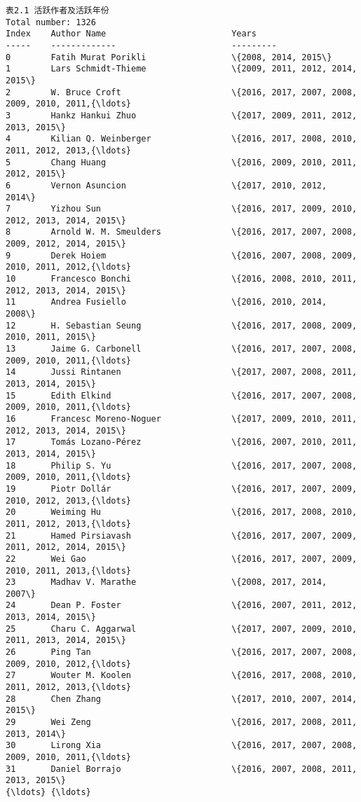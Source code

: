 \documentclass[11pt]{article}
\begin{document}
    \begin{Verbatim}[commandchars=\\\{\}]
                                  表2.1 活跃作者及活跃年份                   
Total number: 1326
Index    Author Name                         Years     
-----    -------------                       --------- 
0        Fatih Murat Porikli                 \{2008, 2014, 2015\}
1        Lars Schmidt-Thieme                 \{2009, 2011, 2012, 2014, 2015\}
2        W. Bruce Croft                      \{2016, 2017, 2007, 2008, 2009, 2010, 2011,{\ldots}
3        Hankz Hankui Zhuo                   \{2017, 2009, 2011, 2012, 2013, 2015\}
4        Kilian Q. Weinberger                \{2016, 2017, 2008, 2010, 2011, 2012, 2013,{\ldots}
5        Chang Huang                         \{2016, 2009, 2010, 2011, 2012, 2015\}
6        Vernon Asuncion                     \{2017, 2010, 2012, 2014\}
7        Yizhou Sun                          \{2016, 2017, 2009, 2010, 2012, 2013, 2014, 2015\}
8        Arnold W. M. Smeulders              \{2016, 2017, 2007, 2008, 2009, 2012, 2014, 2015\}
9        Derek Hoiem                         \{2016, 2007, 2008, 2009, 2010, 2011, 2012,{\ldots}
10       Francesco Bonchi                    \{2016, 2008, 2010, 2011, 2012, 2013, 2014, 2015\}
11       Andrea Fusiello                     \{2016, 2010, 2014, 2008\}
12       H. Sebastian Seung                  \{2016, 2017, 2008, 2009, 2010, 2011, 2015\}
13       Jaime G. Carbonell                  \{2016, 2017, 2007, 2008, 2009, 2010, 2011,{\ldots}
14       Jussi Rintanen                      \{2017, 2007, 2008, 2011, 2013, 2014, 2015\}
15       Edith Elkind                        \{2016, 2017, 2007, 2008, 2009, 2010, 2011,{\ldots}
16       Francesc Moreno-Noguer              \{2017, 2009, 2010, 2011, 2012, 2013, 2014, 2015\}
17       Tomás Lozano-Pérez                  \{2016, 2007, 2010, 2011, 2013, 2014, 2015\}
18       Philip S. Yu                        \{2016, 2017, 2007, 2008, 2009, 2010, 2011,{\ldots}
19       Piotr Dollár                        \{2016, 2017, 2007, 2009, 2010, 2012, 2013,{\ldots}
20       Weiming Hu                          \{2016, 2017, 2008, 2010, 2011, 2012, 2013,{\ldots}
21       Hamed Pirsiavash                    \{2016, 2017, 2007, 2009, 2011, 2012, 2014, 2015\}
22       Wei Gao                             \{2016, 2017, 2007, 2009, 2010, 2011, 2013,{\ldots}
23       Madhav V. Marathe                   \{2008, 2017, 2014, 2007\}
24       Dean P. Foster                      \{2016, 2007, 2011, 2012, 2013, 2014, 2015\}
25       Charu C. Aggarwal                   \{2017, 2007, 2009, 2010, 2011, 2013, 2014, 2015\}
26       Ping Tan                            \{2016, 2017, 2007, 2008, 2009, 2010, 2012,{\ldots}
27       Wouter M. Koolen                    \{2016, 2017, 2008, 2010, 2011, 2012, 2013,{\ldots}
28       Chen Zhang                          \{2017, 2010, 2007, 2014, 2015\}
29       Wei Zeng                            \{2016, 2017, 2008, 2011, 2013, 2014\}
30       Lirong Xia                          \{2016, 2017, 2007, 2008, 2009, 2010, 2011,{\ldots}
31       Daniel Borrajo                      \{2016, 2007, 2008, 2011, 2013, 2015\}
{\ldots} {\ldots}

    \end{Verbatim}
\end{document}
